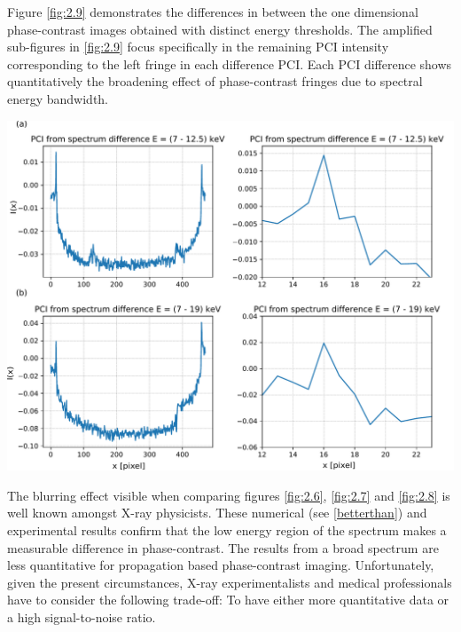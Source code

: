 \documentclass[10pt, a4paper, singlespacing]{report}
\newenvironment{Figure}
    {\par\medskip\noindent\minipage{\linewidth}}
    {\endminipage\par\medskip}
\begin{document}
Figure \ref{fig:2.9} demonstrates the differences in between the one dimensional phase-contrast images obtained with distinct energy thresholds. The amplified sub-figures in \ref{fig:2.9} focus specifically in the remaining PCI intensity corresponding to the left fringe in each difference PCI. Each PCI difference shows quantitatively the broadening effect of phase-contrast fringes due to spectral energy bandwidth.
\begin{Figure}
 \centering
 \includegraphics[width=\linewidth]{diff.pdf}
\label{fig:2.9}  
\end{Figure}
The blurring effect visible when comparing figures \ref{fig:2.6}, \ref{fig:2.7} and \ref{fig:2.8} is well known amongst X-ray physicists. These numerical (see \ref{betterthan}) and experimental results confirm that the low energy region of the spectrum makes a measurable difference in phase-contrast. The results from a broad spectrum are less quantitative for propagation based phase-contrast imaging. Unfortunately, given the present circumstances, X-ray experimentalists and medical professionals have to consider the following trade-off: To have either more quantitative data or a high signal-to-noise ratio.
\end{document}
